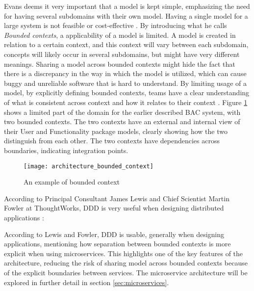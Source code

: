Evans deems it very important that a model is kept simple, emphasizing the need for having several subdomains with their own model. Having a single model for a large system is not feasible or cost-effective \cite[p.~331]{evans2004domain}. By introducing what he calls \textit{Bounded contexts}, a applicability of a model is limited. A model is created in relation to a certain context, and this context will vary between each subdomain, concepts will likely occur in several subdomains, but might have very different meanings. Sharing a model across bounded contexts might hide the fact that there is a discrepancy in the way in which the model is utilized, which can cause buggy and unreliable software that is hard to understand. By limiting usage of a model, by explicitly defining bounded contexts, teams have a clear understanding of what is consistent across context and how it relates to their context \cite[p.~331]{evans2004domain}. Figure \ref{fig:architecture_bounded_context} shows a limited part of the domain for the earlier described BAC system, with two bounded contexts. The two contexts have an external and internal view of their User and Functionality package models, clearly showing how the two distinguish from each other. The two contexts have dependencies across boundaries, indicating integration points.

\begin{figure}[!htb]
  \texttt{[image: architecture\_bounded\_context]}  
  \caption{An example of bounded context}
  \label{fig:architecture_bounded_context}
\end{figure}

According to Principal Consultant James Lewis and Chief Scientist Martin Fowler at ThoughtWorks, DDD is very useful when designing distributed applications \cite{fowler2014microservices}:


According to Lewis and Fowler, DDD is usable, generally when designing applications, mentioning how separation between bounded contexts is more explicit when using microservices. This highlights one of the key features of the architecture, reducing the risk of sharing model across bounded contexts because of the explicit boundaries between services. The microservice architecture will be explored in further detail in section \ref{sec:microservices}.

